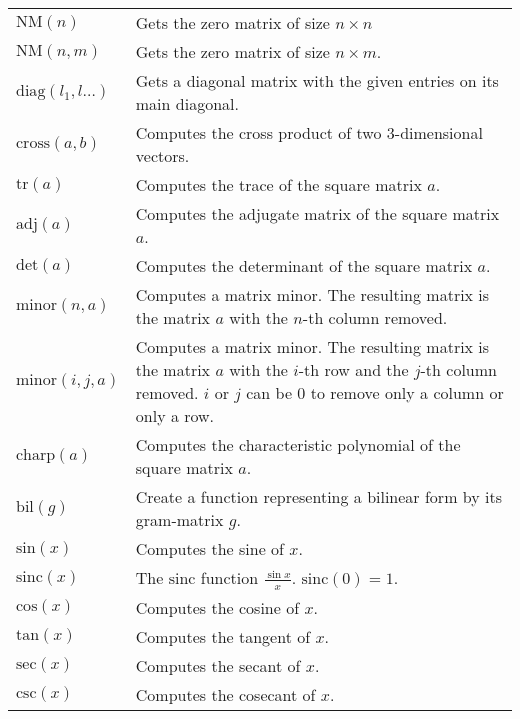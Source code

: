 \documentclass[10pt]{article}
\newcommand{\tabgap}{\vspace{3mm}\\}
\begin{document}
\begin{longtable}{p{}p{}}
        $ \mathrm{NM}(n) $                         & Gets the zero matrix of size $ n\times n $ \\
        $ \mathrm{NM}(n, m) $                      & Gets the zero matrix of size $ n\times m $. \\
        $ \mathrm{diag}(l_1,l\dots) $              & Gets a diagonal matrix with the given entries on its main diagonal. \\
        $ \mathrm{cross}(a, b) $                   & Computes the cross product of two $ 3 $-dimensional vectors. \\
        $ \mathrm{tr}(a) $                         & Computes the trace of the square matrix $ a $. \\
        $ \mathrm{adj}(a) $                        & Computes the adjugate matrix of the square matrix $ a $. \\
        $ \mathrm{det}(a) $                        & Computes the determinant of the square matrix $ a $. \\
        $ \mathrm{minor}(n, a) $                   & Computes a matrix minor. The resulting matrix is the matrix $ a $ with the $ n $-th column removed. \\
        $ \mathrm{minor}(i, j, a) $                & Computes a matrix minor. The resulting matrix is the matrix $ a $ with the $ i $-th row and the $ j $-th column removed. $ i $ or $ j $ can be $ 0 $ to remove only a column or only a row. \\
        $ \mathrm{charp}(a) $                      & Computes the characteristic polynomial of the square matrix $ a $. \\
        $ \mathrm{bil}(g) $                        & Create a function representing a bilinear form by its gram-matrix $ g $. \tabgap
        $ \mathrm{sin}(x) $                        & Computes the sine of $ x $. \\
        $ \mathrm{sinc}(x) $                       & The $ \mathrm{sinc} $ function $ \frac{\sin x}{x} $. $ \mathrm{sinc}(0) = 1 $. \\
        $ \mathrm{cos}(x) $                        & Computes the cosine of $ x $. \\
        $ \mathrm{tan}(x) $                        & Computes the tangent of $ x $. \\
        $ \mathrm{sec}(x) $                        & Computes the secant of $ x $. \\
        $ \mathrm{csc}(x) $                        & Computes the cosecant of $ x $. \\

\end{longtable}
\end{document}
